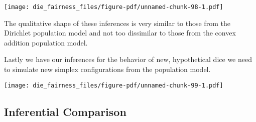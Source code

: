 \documentclass[
  letterpaper,
  DIV=11,
  numbers=noendperiod]{scrartcl}
\newenvironment{Shaded}{\begin{snugshade}}{\end{snugshade}}
\newcommand{\AttributeTok}[1]{\textcolor[rgb]{0.40,0.45,0.13}{#1}}
\newcommand{\ControlFlowTok}[1]{\textcolor[rgb]{0.00,0.23,0.31}{#1}}
\newcommand{\DecValTok}[1]{\textcolor[rgb]{0.68,0.00,0.00}{#1}}
\newcommand{\FloatTok}[1]{\textcolor[rgb]{0.68,0.00,0.00}{#1}}
\newcommand{\FunctionTok}[1]{\textcolor[rgb]{0.28,0.35,0.67}{#1}}
\newcommand{\NormalTok}[1]{\textcolor[rgb]{0.00,0.23,0.31}{#1}}
\newcommand{\OtherTok}[1]{\textcolor[rgb]{0.00,0.23,0.31}{#1}}
\newcommand{\SpecialCharTok}[1]{\textcolor[rgb]{0.37,0.37,0.37}{#1}}
\newcommand{\StringTok}[1]{\textcolor[rgb]{0.13,0.47,0.30}{#1}}
\begin{document}
\texttt{[image: die\_fairness\_files/figure-pdf/unnamed-chunk-98-1.pdf]}

The qualitative shape of these inferences is very similar to those from
the Dirichlet population model and not too dissimilar to those from the
convex addition population model.

Lastly we have our inferences for the behavior of new, hypothetical dice
we need to simulate new simplex configurations from the population
model.

\begin{Shaded}
\end{Shaded}

\texttt{[image: die\_fairness\_files/figure-pdf/unnamed-chunk-99-1.pdf]}

\subsection{Inferential Comparison}\label{inferential-comparison}
\end{document}
